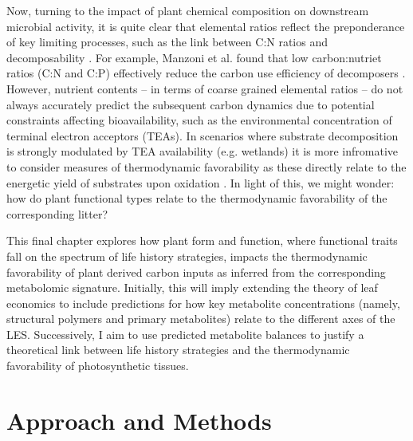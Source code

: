 
Now, turning to the impact of plant chemical composition on downstream microbial activity, it is quite clear that elemental ratios reflect the preponderance of key limiting processes, such as the link between C:N ratios and decomposability \cite{bakker_leaf_2011}. For example, Manzoni et al. found that low carbon:nutriet ratios (C:N and C:P) effectively reduce the carbon use efficiency of decomposers \cite{manzoni_stoichiometric_2010}. However, nutrient contents -- in terms of coarse grained elemental ratios -- do not always accurately predict the subsequent carbon dynamics due to potential constraints affecting bioavailability, such as the environmental concentration of terminal electron acceptors (TEAs). In scenarios where substrate decomposition is strongly modulated by TEA availability (e.g. wetlands) it is more infromative to consider measures of thermodynamic favorability as these directly relate to the energetic yield of substrates upon oxidation \cite{kleerebezem2010a,hough2020a}. In light of this, we might wonder: how do plant functional types relate to the thermodynamic favorability of the corresponding litter?


This final chapter explores how plant form and function, where functional traits fall on the spectrum of life history strategies, impacts the thermodynamic favorability of plant derived carbon inputs as inferred from the corresponding metabolomic signature. Initially, this will imply extending the theory of leaf economics to include predictions for how key metabolite concentrations (namely, structural polymers and primary metabolites) relate to the different axes of the LES. Successively, I aim to use predicted metabolite balances to justify a theoretical link between life history strategies and the thermodynamic favorability of photosynthetic tissues. 

\section{Approach and Methods}



